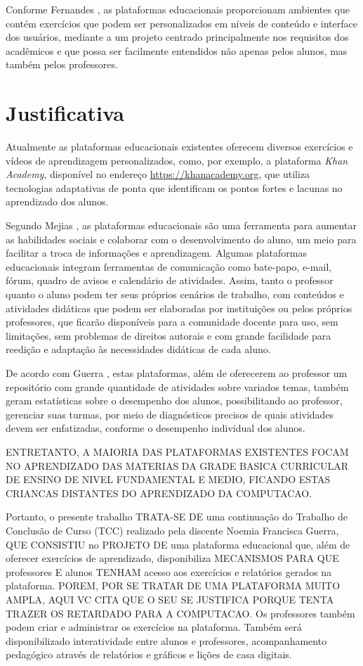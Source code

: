 Conforme Fernandes \cite{fernandez2013mobile}, as plataformas educacionais proporcionam ambientes que contém exercícios que podem ser personalizados em níveis de conteúdo e interface dos usuários, mediante a um projeto centrado principalmente nos requisitos dos acadêmicos e que possa ser facilmente entendidos não apenas pelos alunos, mas também pelos professores.

\newpage

\section{Justificativa}

Atualmente as plataformas educacionais existentes oferecem diversos exercícios e vídeos de aprendizagem personalizados, como, por exemplo, a plataforma \textit{Khan Academy}, disponível no endereço \url{https://khanacademy.org}, que utiliza tecnologias adaptativas de ponta que identificam os pontos fortes e lacunas no aprendizado dos alunos.

Segundo Mejias \cite{mejias2006teaching}, as plataformas educacionais são uma ferramenta para aumentar as habilidades sociais e colaborar com o desenvolvimento do aluno, um meio para facilitar a troca de informações e aprendizagem. Algumas plataformas educacionais integram ferramentas de comunicação como bate-papo, e-mail, fórum, quadro de avisos e calendário de atividades. Assim, tanto o professor quanto o aluno podem ter seus próprios cenários de trabalho, com conteúdos e atividades didáticas que podem ser elaboradas por instituições ou pelos próprios professores, que ficarão disponíveis para a comunidade docente para uso, sem limitações, sem problemas de direitos autorais e com grande facilidade para reedição e adaptação às necessidades didáticas de cada aluno.

De acordo com Guerra \cite{Guerra}, estas plataformas, além de oferecerem ao professor um repositório com grande quantidade de atividades sobre variados temas, também geram estatísticas sobre o desempenho dos alunos, possibilitando ao professor, gerenciar suas turmas, por meio de diagnósticos precisos de quais atividades devem ser enfatizadas, conforme o desempenho individual dos alunos.

ENTRETANTO, A MAIORIA DAS PLATAFORMAS EXISTENTES FOCAM NO APRENDIZADO DAS MATERIAS DA GRADE BASICA CURRICULAR DE ENSINO DE NIVEL FUNDAMENTAL E MEDIO, FICANDO ESTAS CRIANCAS DISTANTES DO APRENDIZADO DA COMPUTACAO.

Portanto, o presente trabalho TRATA-SE DE uma continuação do Trabalho de Conclusão de Curso (TCC) realizado pela discente Noemia Francisca Guerra, QUE CONSISTIU no PROJETO DE uma plataforma educacional que, além de oferecer exercícios de aprendizado, disponibiliza MECANISMOS PARA QUE professores E alunos TENHAM acesso aos exercícios e relatórios gerados na plataforma. POREM, POR SE TRATAR DE UMA PLATAFORMA MUITO AMPLA, AQUI VC CITA QUE O SEU SE JUSTIFICA PORQUE TENTA TRAZER OS RETARDADO PARA A COMPUTACAO. Os professores também podem criar e administrar os exercícios na plataforma. Também será disponibilizado interatividade entre alunos e professores, acompanhamento pedagógico através de relatórios e gráficos e lições de casa digitais.

